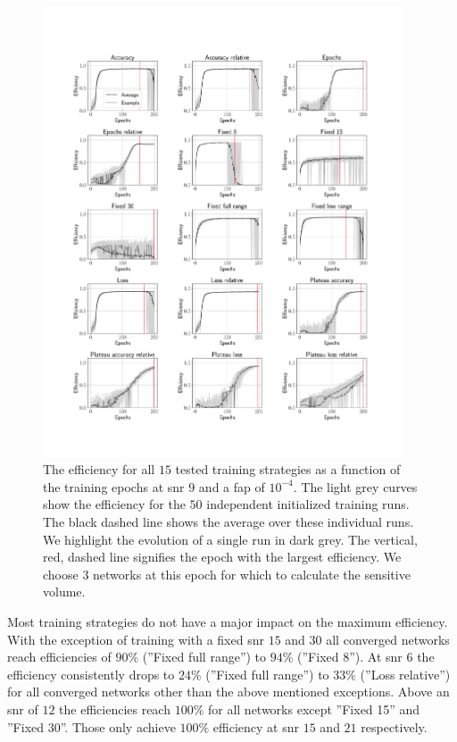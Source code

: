 \begin{figure}
    \centering
    \includegraphics[width=0.95\textwidth, trim=2.5cm 5cm 2.5cm 2cm]{chapters/training_strats/images/overview_softmax.pdf}
    \caption[Network efficiency with Softmax overview]{The efficiency for all $15$ tested training strategies as a function of the training epochs at \acrshort{snr} $9$ and a \acrshort{fap} of $10^{-4}$. The light grey curves show the efficiency for the $50$ independent initialized training runs. The black dashed line shows the average over these individual runs. We highlight the evolution of a single run in dark grey. The vertical, red, dashed line signifies the epoch with the largest efficiency. We choose $3$ networks at this epoch for which to calculate the sensitive volume.}
    \label{fig:efficiency_evolution_all}
\end{figure}

Most training strategies do not have a major impact on the maximum efficiency. With the exception of training with a fixed \acrshort{snr} $15$ and $30$ all converged networks reach efficiencies of $90\%$ (''Fixed full range'') to $94\%$ (''Fixed 8''). At \acrshort{snr} $6$ the efficiency consistently drops to $24\%$ (''Fixed full range'') to $33\%$ (''Loss relative'') for all converged networks other than the above mentioned exceptions. Above an \acrshort{snr} of $12$ the efficiencies reach $100\%$ for all networks except ''Fixed 15'' and ''Fixed 30''. Those only achieve $100\%$ efficiency at \acrshort{snr} $15$ and $21$ respectively.

